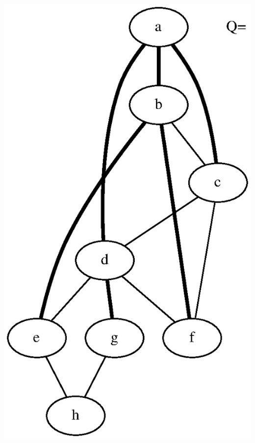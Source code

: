 \documentclass{article}
\begin{document}
\includegraphics[height=.3\textheight]{bfs_undirected_classroom_04.eps}
\vspace{1em}
\end{document}
